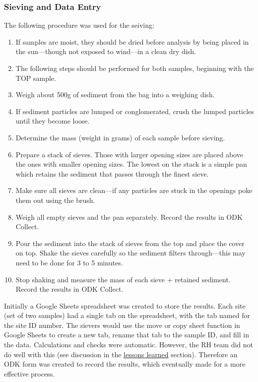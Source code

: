 \documentclass[a4paper,12pt]{article}
\begin{document}
\subsubsection{Sieving and Data Entry}
The following procedure was used for the seiving:

\begin{enumerate}
  \item If samples are moist, they should be dried before analysis by being placed in the sun---though not exposed to wind---in a clean dry dish. 
  \item The following steps should be performed for both samples, beginning with the TOP sample.
  \item Weigh about 500g of sediment from the bag into a weighing dish.
  \item If sediment particles are lumped or conglomerated, crush the lumped particles until they become loose.
  \item Determine the mass (weight in grams) of each sample before sieving.
  \item Prepare a stack of sieves. Those with larger opening sizes are placed above the ones with smaller opening sizes. The lowest on the stack is a simple pan which retains the sediment that passes through the finest sieve.
  \item Make sure all sieves are clean---if any particles are stuck in the openings poke them out using the brush.
  \item Weigh all empty sieves and the pan separately. Record the results in ODK Collect.
  \item Pour the sediment into the stack of sieves from the top and place the cover on top. Shake the sieves carefully so the sediment filters through---this may need to be done for 3 to 5 minutes.
  \item Stop shaking and measure the mass of each sieve + retained sediment. Record the results in ODK Collect.
\end{enumerate}

Initially a Google Sheets spreadsheet was created to store the results. Each site (set of two samples) had a single tab on the spreadsheet, with the tab named for the site ID number. The sievers would use the move or copy sheet function in Google Sheets to create a new tab, rename that tab to the sample ID, and fill in the data. Calculations and checks were automatic. However, the RH team did not do well with this (see discussion in the \hyperlink{lessonslearned}{lessons learned} section). Therefore an ODK form was created to record the results, which eventually made for a more effective process. 
\end{document}
